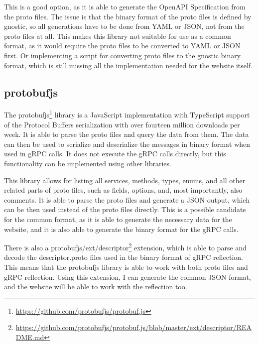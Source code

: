 This is a good option, as it is able to generate the OpenAPI Specification from the proto files.
The issue is that the binary format of the proto files is defined by gnostic, so all generations have to be done from YAML or JSON, not from the proto files at all.
This makes this library not suitable for use as a common format, as it would require the proto files to be converted to YAML or JSON first.
Or implementing a script for converting proto files to the gnostic binary format, which is still missing all the implementation needed for the website itself.


\subsection{protobufjs}
The protobufjs\footnote{\url{https://github.com/protobufjs/protobuf.js}} library is a JavaScript implementation with TypeScript support of the Protocol Buffers serialization with over fourteen million downloads per week.
It is able to parse the proto files and query the data from them.
The data can then be used to serialize and deserialize the messages in binary format when used in gRPC calls.
It does not execute the gRPC calls directly, but this functionality can be implemented using other libraries.
\cite{protobufjs}

This library allows for listing all services, methods, types, enums, and all other related parts of proto files, such as fields, options, and, most importantly, also comments.
It is able to parse the proto files and generate a JSON output, which can be then used instead of the proto files directly.
This is a possible candidate for the common format, as it is able to generate the necessary data for the website, and it is also able to generate the binary format for the gRPC calls.

There is also a protobufjs/ext/descriptor\footnote{\url{https://github.com/protobufjs/protobuf.js/blob/master/ext/descriptor/README.md}} extension, which is able to parse and decode the descriptor.proto files used in the binary format of gRPC reflection.
This means that the protobufjs library is able to work with both proto files and gRPC reflection.
Using this extension, I can generate the common JSON format, and the website will be able to work with the reflection too.


